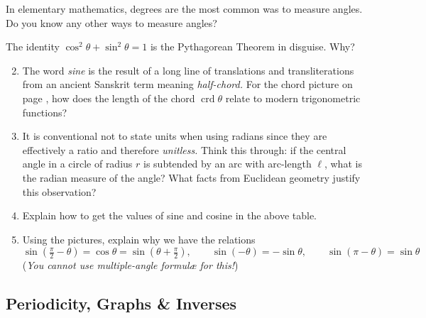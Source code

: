 In elementary mathematics, degrees are the most common was to measure angles. Do you know any other ways to measure angles?

\begin{exercises}
\exstart The identity $\cos^2\!\theta+\sin^2\!\theta=1$ is the Pythagorean Theorem in disguise. Why?
\begin{enumerate}\setcounter{enumi}{1}
  \item The word \emph{sine} is the result of a long line of translations and transliterations from an ancient Sanskrit term meaning \emph{half-chord.} For the chord picture on page \pageref{sec:trig}, how does the length of the chord $\operatorname{crd}\theta$ relate to modern trigonometric functions?

	\item It is conventional not to state units when using radians since they are effectively a ratio and therefore \emph{unitless.} Think this through: if the central angle in a circle of radius $r$ is subtended by an arc with arc-length $\ell$, what is the radian measure of the angle? What facts from Euclidean geometry justify this observation?
	
  \item Explain how to get the values of sine and cosine in the above table.
  
  \item Using the pictures, explain why we have the relations
	\[\sin(\tfrac \pi 2-\theta)=\cos\theta=\sin(\theta+\tfrac\pi 2),\qquad \sin(-\theta)=-\sin\theta,\qquad \sin(\pi-\theta)=\sin\theta\]
	(\emph{You cannot use multiple-angle formulæ for this!})
\end{enumerate}
\end{exercises}

\clearpage

\subsection{Periodicity, Graphs \& Inverses}\label{ssec:trigperiod}


